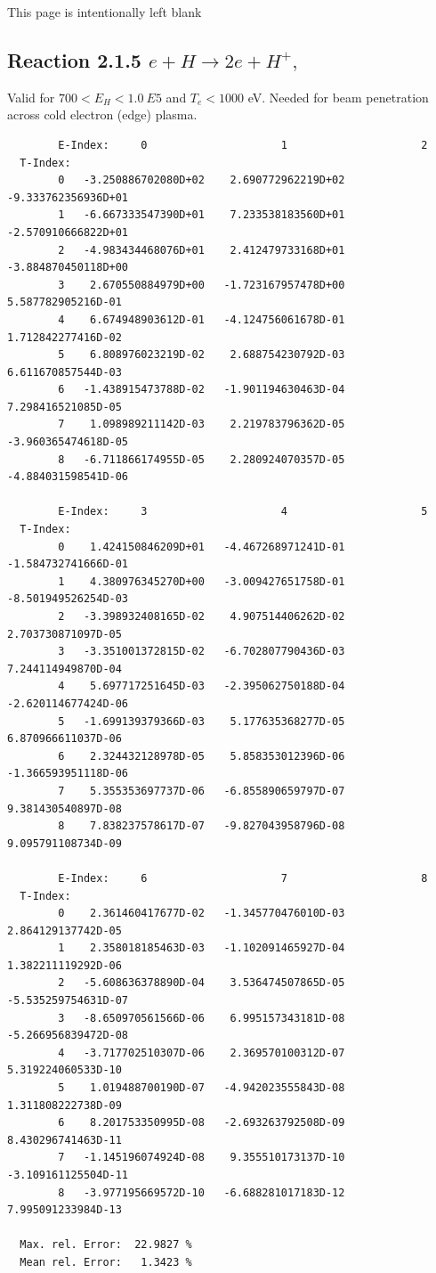 \documentclass[12pt,dvips]{article}
\begin{document}
\newpage
This page is intentionally left blank
\newpage
\subsection{
Reaction 2.1.5  $e + H \rightarrow 2e + H^+ ,\ $ }

Valid for $ 700 < E_H < 1.0~ E5$ and $T_e  < 1000$ eV.
Needed for beam penetration across cold electron (edge) plasma.

\begin{small}\begin{verbatim}
        E-Index:     0                     1                     2
  T-Index:
        0   -3.250886702080D+02    2.690772962219D+02   -9.333762356936D+01
        1   -6.667333547390D+01    7.233538183560D+01   -2.570910666822D+01
        2   -4.983434468076D+01    2.412479733168D+01   -3.884870450118D+00
        3    2.670550884979D+00   -1.723167957478D+00    5.587782905216D-01
        4    6.674948903612D-01   -4.124756061678D-01    1.712842277416D-02
        5    6.808976023219D-02    2.688754230792D-03    6.611670857544D-03
        6   -1.438915473788D-02   -1.901194630463D-04    7.298416521085D-05
        7    1.098989211142D-03    2.219783796362D-05   -3.960365474618D-05
        8   -6.711866174955D-05    2.280924070357D-05   -4.884031598541D-06

        E-Index:     3                     4                     5
  T-Index:
        0    1.424150846209D+01   -4.467268971241D-01   -1.584732741666D-01
        1    4.380976345270D+00   -3.009427651758D-01   -8.501949526254D-03
        2   -3.398932408165D-02    4.907514406262D-02    2.703730871097D-05
        3   -3.351001372815D-02   -6.702807790436D-03    7.244114949870D-04
        4    5.697717251645D-03   -2.395062750188D-04   -2.620114677424D-06
        5   -1.699139379366D-03    5.177635368277D-05    6.870966611037D-06
        6    2.324432128978D-05    5.858353012396D-06   -1.366593951118D-06
        7    5.355353697737D-06   -6.855890659797D-07    9.381430540897D-08
        8    7.838237578617D-07   -9.827043958796D-08    9.095791108734D-09

        E-Index:     6                     7                     8
  T-Index:
        0    2.361460417677D-02   -1.345770476010D-03    2.864129137742D-05
        1    2.358018185463D-03   -1.102091465927D-04    1.382211119292D-06
        2   -5.608636378890D-04    3.536474507865D-05   -5.535259754631D-07
        3   -8.650970561566D-06    6.995157343181D-08   -5.266956839472D-08
        4   -3.717702510307D-06    2.369570100312D-07    5.319224060533D-10
        5    1.019488700190D-07   -4.942023555843D-08    1.311808222738D-09
        6    8.201753350995D-08   -2.693263792508D-09    8.430296741463D-11
        7   -1.145196074924D-08    9.355510173137D-10   -3.109161125504D-11
        8   -3.977195669572D-10   -6.688281017183D-12    7.995091233984D-13

  Max. rel. Error:  22.9827 %
  Mean rel. Error:   1.3423 %

\end{verbatim}\end{small}
\end{document}
